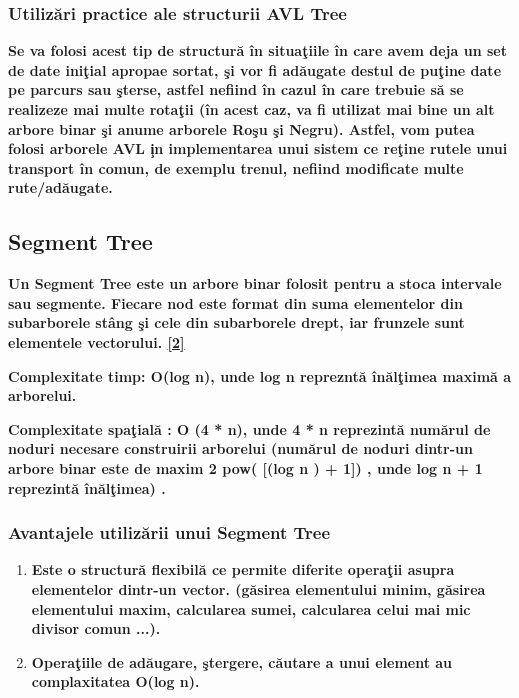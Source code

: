 \documentclass[12pt]{article}
\begin{document}
\subsubsection{Utiliz\u{a}ri practice ale structurii AVL Tree}

\textbf{\hspace{7mm}Se va folosi acest tip de structur\u{a} \^{i}n situa\c{t}iile \^{i}n care avem deja un set de date ini\c{t}ial apropae sortat, \c{s}i vor fi ad\u{a}ugate destul de pu\c{t}ine date pe parcurs sau \c{s}terse, astfel nefiind \^{i}n cazul \^{i}n care trebuie s\u{a} se realizeze mai multe rota\c{t}ii (\^{i}n acest caz, va fi utilizat mai bine un alt arbore binar \c{s}i anume arborele Ro\c{s}u \c{s}i Negru). Astfel, vom putea folosi arborele AVL \c{i}n implementarea unui sistem ce re\c{t}ine rutele unui transport \^{i}n comun, de exemplu trenul, nefiind modificate multe rute/ad\u{a}ugate.  }

\subsection{Segment Tree}

\textbf{\hspace{7mm} Un Segment Tree este un arbore binar folosit pentru a stoca intervale sau segmente. Fiecare nod este format din suma elementelor din subarborele st\^{a}ng \c{s}i cele din subarborele drept, iar frunzele sunt elementele vectorului. \hyperlink{page.14}{[2]}}

\textbf{\hspace{7mm} Complexitate timp: O(log n), unde log n repreznt\u{a} \^{i}n\u{a}l\c{t}imea maxim\u{a} a arborelui. }

\textbf{\hspace{7mm} Complexitate spa\c{t}ial\u{a} : O (4 * n), unde 4 * n reprezint\u{a} num\u{a}rul de noduri necesare construirii arborelui (num\u{a}rul de noduri dintr-un arbore binar este de maxim 2 pow( [(log n ) + 1]) , unde log n + 1 reprezint\u{a} \^{i}n\u{a}l\c{t}imea) .}

\subsubsection{Avantajele utiliz\u{a}rii unui Segment Tree}

\begin{enumerate}
\item{\textbf{Este o structur\u{a} flexibil\u{a} ce permite diferite opera\c{t}ii asupra elementelor dintr-un vector. (g\u{a}sirea elementului minim, g\u{a}sirea elementului maxim, calcularea sumei, calcularea celui mai mic divisor comun ...).}}

\item{\textbf{Opera\c{t}iile de ad\u{a}ugare, \c{s}tergere, c\u{a}utare a unui element au complaxitatea O(log n).}}

\end{enumerate}
\end{document}

